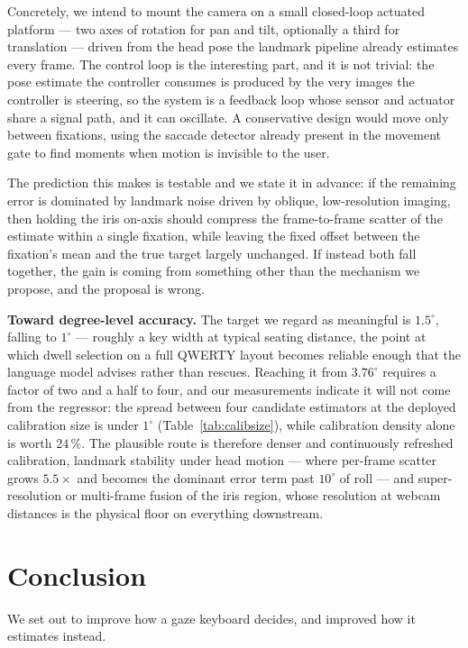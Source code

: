 \documentclass[conference]{IEEEtran}
\begin{document}
Concretely, we intend to mount the camera on a small closed-loop actuated
platform --- two axes of rotation for pan and tilt, optionally a third for
translation --- driven from the head pose the landmark pipeline already
estimates every frame. The control loop is the interesting part, and it is not
trivial: the pose estimate the controller consumes is produced by the very
images the controller is steering, so the system is a feedback loop whose sensor
and actuator share a signal path, and it can oscillate. A conservative design
would move only between fixations, using the saccade detector already present in
the movement gate to find moments when motion is invisible to the user.

The prediction this makes is testable and we state it in advance: if the
remaining error is dominated by landmark noise driven by oblique, low-resolution
imaging, then holding the iris on-axis should compress the frame-to-frame
scatter of the estimate within a single fixation, while leaving the fixed offset
between the fixation's mean and the true target largely unchanged. If instead
both fall together, the gain is coming from something other than the mechanism
we propose, and the proposal is wrong.

\textbf{Toward degree-level accuracy.} The target we regard as meaningful is
$1.5^\circ$, falling to $1^\circ$ --- roughly a key width at typical seating
distance, the point at which dwell selection on a full QWERTY layout becomes
reliable enough that the language model advises rather than rescues. Reaching it
from $3.76^\circ$ requires a factor of two and a half to four, and our
measurements
indicate it will not come from the regressor: the spread between four candidate
estimators at the deployed calibration size is under $1^\circ$
(Table~\ref{tab:calibsize}), while calibration density alone is worth $24\,\%$.
The plausible route is therefore denser and continuously refreshed calibration,
landmark stability under head motion --- where per-frame scatter grows
$5.5\times$ and becomes the dominant error term past $10^\circ$ of roll --- and
super-resolution or multi-frame fusion of the iris region, whose resolution at
webcam distances is the physical floor on everything downstream.

\section{Conclusion}

We set out to improve how a gaze keyboard decides, and improved how it estimates
instead.
\end{document}
